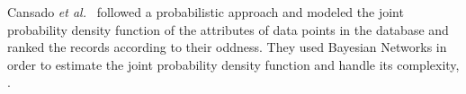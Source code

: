 Cansado {\em et al.}~\cite{Cansado2008} followed a probabilistic approach and modeled the joint probability density function of the attributes of data points in the database and ranked the records according to their oddness. They used Bayesian Networks in order to estimate the joint probability density function and handle its complexity, .
\\ 
